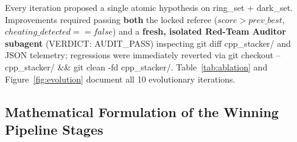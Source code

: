 \documentclass[10pt,twocolumn,letterpaper]{article}
\DeclareRobustCommand{\code}[1]{\texttt{#1}}
\def\code#1{#1}%
\begin{document}
Every iteration proposed a single atomic hypothesis on \code{ring\_set} + \code{dark\_set}. Improvements required passing \textbf{both} the locked referee ($\code{score} > \code{prev\_best}$, $\code{cheating\_detected == false}$) and a \textbf{fresh, isolated Red-Team Auditor subagent} (\code{VERDICT: AUDIT\_PASS}) inspecting \code{git diff cpp\_stacker/} and JSON telemetry; regressions were immediately reverted via \code{git checkout -- cpp\_stacker/ \&\& git clean -fd cpp\_stacker/}. Table~\ref{tab:ablation} and Figure~\ref{fig:evolution} document all 10 evolutionary iterations.

\subsection{Mathematical Formulation of the Winning Pipeline Stages}
\end{document}
